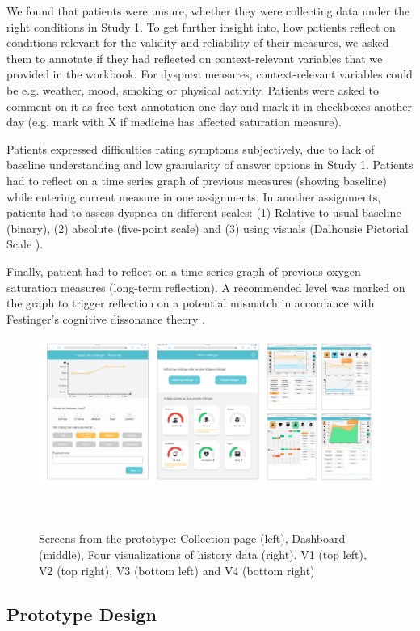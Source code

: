 We found that patients were unsure, whether they were collecting data under the right conditions in Study 1. To get further insight into, how patients reflect on conditions relevant for the validity and reliability of their measures, we asked them to annotate if they had reflected on context-relevant variables that we provided in the workbook. For dyspnea measures, context-relevant variables could be e.g. weather, mood, smoking or physical activity. Patients were asked to comment on it as free text annotation one day and mark it in checkboxes another day (e.g. mark with X if medicine has affected saturation measure). 

Patients expressed difficulties rating symptoms subjectively, due to lack of baseline understanding and low granularity of answer options in Study 1. Patients had to reflect on a time series graph of previous measures (showing baseline) while entering current measure in one assignments. In another assignments, patients had to assess dyspnea on different scales: (1) Relative to usual baseline (binary), (2) absolute (five-point scale) and (3) using visuals (Dalhousie Pictorial Scale \cite{dalhousie}).  

Finally, patient had to reflect on a time series graph of previous oxygen saturation measures (long-term reflection). A recommended level was marked on the graph to trigger reflection on a potential mismatch in accordance with Festinger’s cognitive dissonance theory \cite{Rivera}. 

\begin{figure}
  \centering
  \includegraphics[width=2.1\columnwidth]{img/screens}
  \caption{Screens from the prototype: Collection page (left), Dashboard (middle), Four visualizations of history data (right). V1 (top left), V2 (top right), V3 (bottom left) and V4 (bottom right)}~\label{fig:design}
\end{figure}

\subsection{Prototype Design}
